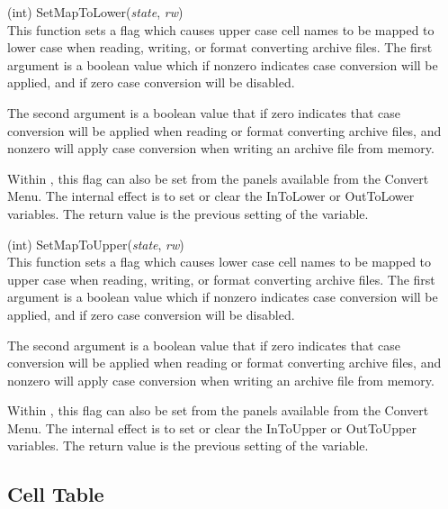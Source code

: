 \begin{description}
\item{(int) \vt SetMapToLower({\it state}, {\it rw})}\\
This function sets a flag which causes upper case cell names to be
mapped to lower case when reading, writing, or format converting
archive files.  The first argument is a boolean value which if nonzero
indicates case conversion will be applied, and if zero case conversion
will be disabled.

The second argument is a boolean value that if zero indicates that
case conversion will be applied when reading or format converting
archive files, and nonzero will apply case conversion when writing an
archive file from memory.
 
Within {\Xic}, this flag can also be set from the panels available
from the {\cb Convert Menu}.  The internal effect is to set or clear
the {\et InToLower} or {\et OutToLower} variables.  The return value
is the previous setting of the variable.

\item{(int) \vt SetMapToUpper({\it state}, {\it rw})}\\
This function sets a flag which causes lower case cell names to be
mapped to upper case when reading, writing, or format converting
archive files.  The first argument is a boolean value which if nonzero
indicates case conversion will be applied, and if zero case conversion
will be disabled.

The second argument is a boolean value that if zero indicates that
case conversion will be applied when reading or format converting
archive files, and nonzero will apply case conversion when writing an
archive file from memory.
 
Within {\Xic}, this flag can also be set from the panels available
from the {\cb Convert Menu}.  The internal effect is to set or clear
the {\et InToUpper} or {\et OutToUpper} variables.  The return value
is the previous setting of the variable.

\end{description}


\subsection{Cell Table}
\label{celltab}

